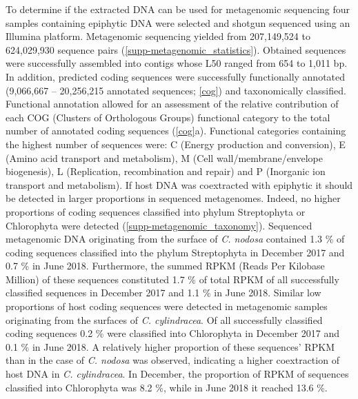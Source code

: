 \documentclass[12pt,]{article}
\begin{document}
To determine if the extracted DNA can be used for metagenomic sequencing
four samples containing epiphytic DNA were selected and shotgun
sequenced using an Illumina platform. Metagenomic sequencing yielded
from 207,149,524 to 624,029,930 sequence pairs
(\autoref{supp-metagenomic_statistics}). Obtained sequences were
successfully assembled into contigs whose L50 ranged from 654 to 1,011
bp. In addition, predicted coding sequences were successfully
functionally annotated (9,066,667 -- 20,256,215 annotated sequences;
\autoref{cog}) and taxonomically classified. Functional annotation
allowed for an assessment of the relative contribution of each COG
(Clusters of Orthologous Groups) functional category to the total number
of annotated coding sequences (\autoref{cog}a). Functional categories
containing the highest number of sequences were: C (Energy production
and conversion), E (Amino acid transport and metabolism), M (Cell
wall/membrane/envelope biogenesis), L (Replication, recombination and
repair) and P (Inorganic ion transport and metabolism). If host DNA was
coextracted with epiphytic it should be detected in larger proportions
in sequenced metagenomes. Indeed, no higher proportions of coding
sequences classified into phylum Streptophyta or Chlorophyta were
detected (\autoref{supp-metagenomic_taxonomy}). Sequenced metagenomic
DNA originating from the surface of \emph{C. nodosa} contained 1.3
\si{\percent} of coding sequences classified into the phylum
Streptophyta in December 2017 and 0.7 \si{\percent} in June 2018.
Furthermore, the summed RPKM (Reads Per Kilobase Million) of these
sequences constituted 1.7 \si{\percent} of total RPKM of all
successfully classified sequences in December 2017 and 1.1 \si{\percent}
in June 2018. Similar low proportions of host coding sequences were
detected in metagenomic samples originating from the surfaces of
\emph{C. cylindracea}. Of all successfully classified coding sequences
0.2 \si{\percent} were classified into Chlorophyta in December 2017 and
0.1 \si{\percent} in June 2018. A relatively higher proportion of these
sequences' RPKM than in the case of \emph{C. nodosa} was observed,
indicating a higher coextraction of host DNA in \emph{C. cylindracea}.
In December, the proportion of RPKM of sequences classified into
Chlorophyta was 8.2 \si{\percent}, while in June 2018 it reached 13.6
\si{\percent}.
\end{document}
